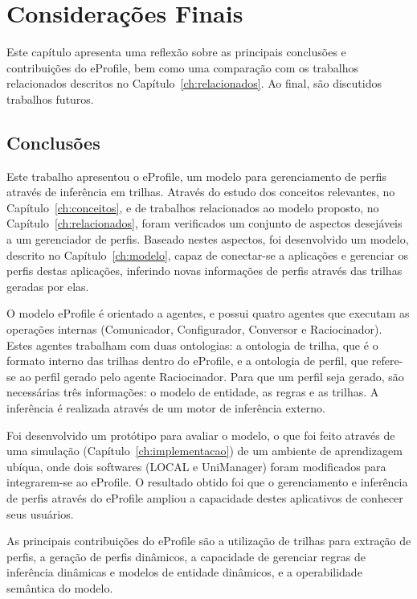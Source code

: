 \chapter{Considerações Finais}
\label{ch:consideracoes}

Este capítulo apresenta uma reflexão sobre as principais conclusões e contribuições do eProfile, bem como uma comparação com os trabalhos relacionados descritos no Capítulo~\ref{ch:relacionados}. Ao final, são discutidos trabalhos futuros.


\section{Conclusões}
\label{sec:conclusoes}

Este trabalho apresentou o eProfile, um modelo para gerenciamento de perfis através de inferência em trilhas. Através do estudo dos conceitos relevantes, no Capítulo~\ref{ch:conceitos}, e de trabalhos relacionados ao modelo proposto, no Capítulo~\ref{ch:relacionados}, foram verificados um conjunto de aspectos desejáveis a um gerenciador de perfis. Baseado nestes aspectos, foi desenvolvido um modelo, descrito no Capítulo~\ref{ch:modelo}, capaz de conectar-se a aplicações e gerenciar os perfis destas aplicações, inferindo novas informações de perfis através das trilhas geradas por elas.

O modelo eProfile é orientado a agentes, e possui quatro agentes que executam as operações internas (Comunicador, Configurador, Conversor e Raciocinador). Estes agentes trabalham com duas ontologias: a ontologia de trilha, que é o formato interno das trilhas dentro do eProfile, e a ontologia de perfil, que refere-se ao perfil gerado pelo agente Raciocinador. Para que um perfil seja gerado, são necessárias três informações: o modelo de entidade, as regras e as trilhas. A inferência é realizada através de um motor de inferência externo.

Foi desenvolvido um protótipo para avaliar o modelo, o que foi feito através de uma simulação (Capítulo~\ref{ch:implementacao}) de um ambiente de aprendizagem ubíqua, onde dois softwares (LOCAL e UniManager) foram modificados para integrarem-se ao eProfile. O resultado obtido foi que o gerenciamento e inferência de perfis através do eProfile ampliou a capacidade destes aplicativos de conhecer seus usuários.

As principais contribuições do eProfile são a utilização de trilhas para extração de perfis, a geração de perfis dinâmicos, a capacidade de gerenciar regras de inferência dinâmicas e modelos de entidade dinâmicos, e a operabilidade semântica do modelo.

